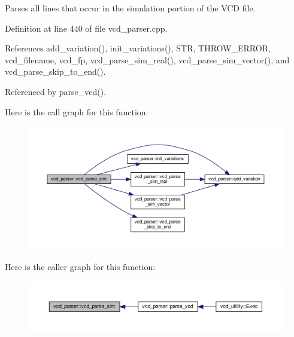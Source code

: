 Parses all lines that occur in the simulation portion of the V\+CD file. 



Definition at line 440 of file vcd\+\_\+parser.\+cpp.



References add\+\_\+variation(), init\+\_\+variations(), S\+TR, T\+H\+R\+O\+W\+\_\+\+E\+R\+R\+OR, vcd\+\_\+filename, vcd\+\_\+fp, vcd\+\_\+parse\+\_\+sim\+\_\+real(), vcd\+\_\+parse\+\_\+sim\+\_\+vector(), and vcd\+\_\+parse\+\_\+skip\+\_\+to\+\_\+end().



Referenced by parse\+\_\+vcd().

Here is the call graph for this function\+:
\nopagebreak
\begin{figure}[H]
\begin{center}
\leavevmode
\includegraphics[width=350pt]{d2/d25/classvcd__parser_a591daeaca11ad1bea3fd9a3c5c4b99de_cgraph}
\end{center}
\end{figure}
Here is the caller graph for this function\+:
\nopagebreak
\begin{figure}[H]
\begin{center}
\leavevmode
\includegraphics[width=350pt]{d2/d25/classvcd__parser_a591daeaca11ad1bea3fd9a3c5c4b99de_icgraph}
\end{center}
\end{figure}
\mbox{\label{classvcd__parser_a0cec69a0f950aa8fb3cf7804b6f89045}} 
